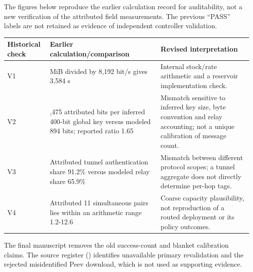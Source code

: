 \documentclass[a4paper,11pt]{article}
\begin{document}
The figures below reproduce the earlier calculation record for auditability, not a new verification of the attributed field measurements. The previous ``PASS'' labels are not retained as evidence of independent controller validation.

{\def\LTcaptype{none} %
\begin{longtable}[]{@{}
  >{\raggedright\arraybackslash}p{}
  >{\raggedright\arraybackslash}p{}
  >{\raggedright\arraybackslash}p{}@{}}
\toprule\noalign{}
\begin{minipage}[b]{\linewidth}\raggedright
Historical check
\end{minipage} & \begin{minipage}[b]{\linewidth}\raggedright
Earlier calculation/comparison
\end{minipage} & \begin{minipage}[b]{\linewidth}\raggedright
Revised interpretation
\end{minipage} \\
\midrule\noalign{}
\endhead
\bottomrule\noalign{}
\endlastfoot
V1 & 3.5 MiB divided by 8,192 bit/s gives 3,584 s & Internal stock/rate arithmetic and a reservoir implementation check. \\
V2 & 1,475 attributed bits per inferred 400-bit global key versus modeled 894 bits; reported ratio 1.65 & Mismatch sensitive to inferred key size, byte convention and relay accounting; not a unique calibration of message count. \\
V3 & Attributed tunnel authentication share 91.2\% versus modeled relay share 65.9\% & Mismatch between different protocol scopes; a tunnel aggregate does not directly determine per-hop tags. \\
V4 & Attributed 11 simultaneous pairs lies within an arithmetic range 1.2-12.6 & Coarse capacity plausibility, not reproduction of a routed deployment or its policy outcomes. \\
\end{longtable}
}

The final manuscript removes the old success-count and blanket calibration claims. The source register () identifies unavailable primary revalidation and the rejected misidentified Peev download, which is not used as supporting evidence.
\end{document}
